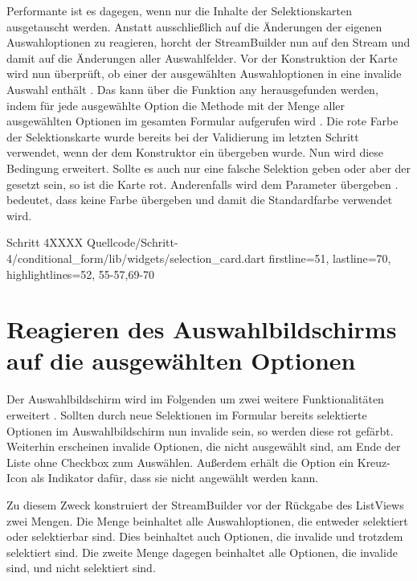Performante ist es dagegen,
wenn nur die Inhalte der Selektionskarten ausgetauscht werden.
Anstatt ausschließlich auf die Änderungen der eigenen Auswahloptionen zu reagieren,
horcht der StreamBuilder nun auf den Stream  
und damit auf die Änderungen aller Auswahlfelder.
Vor der Konstruktion der Karte wird nun überprüft,
ob einer der ausgewählten Auswahloptionen in  eine invalide Auswahl enthält .
Das kann über die Funktion any herausgefunden werden,
indem  für jede ausgewählte Option die Methode  mit der Menge aller ausgewählten Optionen im gesamten Formular aufgerufen wird . 
Die rote Farbe der Selektionskarte wurde bereits bei der Validierung im letzten Schritt verwendet,
wenn der dem Konstruktor ein  übergeben wurde.
Nun wird diese Bedingung erweitert.
Sollte es auch nur eine falsche Selektion geben
oder aber der  gesetzt sein,
so ist die Karte rot.
Anderenfalls wird dem Parameter   übergeben .
 bedeutet, dass keine Farbe übergeben und damit die Standardfarbe verwendet wird.

\begin{alexlisting}{Schritt 4}{XXXX}
  {Quellcode/Schritt-4/conditional_form/lib/widgets/selection_card.dart}
  {firstline=51, lastline=70, highlightlines={52, 55-57,69-70}}
  \label{lst:Schritt4StreamBuilderpriorChoices}
\end{alexlisting} 



\ifIncludeFigures \clearpage \fi

\section{Reagieren des Auswahlbildschirms auf die ausgewählten Optionen}



Der Auswahlbildschirm wird im Folgenden um zwei weitere Funktionalitäten erweitert \Lst{\ref{lst:Schritt4selectedAndSelectableChoices}}.
Sollten durch neue Selektionen im Formular bereits selektierte Optionen im Auswahlbildschirm nun invalide sein,
so werden diese rot gefärbt.
Weiterhin erscheinen invalide Optionen,
die nicht ausgewählt sind,
am Ende der Liste ohne Checkbox zum Auswählen.
Außerdem erhält die Option ein Kreuz-Icon als Indikator dafür, dass sie nicht angewählt werden kann.

Zu diesem Zweck konstruiert der StreamBuilder vor der Rückgabe des ListViews zwei Mengen.
Die Menge   beinhaltet alle Auswahloptionen,
die entweder selektiert oder selektierbar sind.
Dies beinhaltet auch Optionen, die invalide und trotzdem selektiert sind.
Die zweite Menge   dagegen beinhaltet alle Optionen,
die invalide sind, und nicht selektiert sind.

